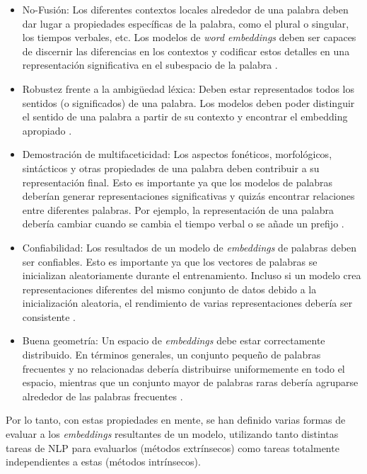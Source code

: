 \begin{itemize}
    \item No-Fusión: Los diferentes contextos locales alrededor de una palabra deben dar lugar a propiedades específicas de la palabra, como el plural o singular, los tiempos verbales, etc. Los modelos de \textit{word embeddings} deben ser capaces de discernir las diferencias en los contextos y codificar estos detalles en una representación significativa en el subespacio de la palabra \parencite{yaghoobzadeh2016intrinsicsubspaceevaluationword}.
    \item Robustez frente a la ambigüedad léxica: Deben estar representados todos los sentidos (o significados) de una palabra. Los modelos deben poder distinguir el sentido de una palabra a partir de su contexto y encontrar el embedding apropiado \parencite{yaghoobzadeh2016intrinsicsubspaceevaluationword}.
    \item Demostración de multifaceticidad: Los aspectos fonéticos, morfológicos, sintácticos y otras propiedades de una palabra deben contribuir a su representación final. Esto es importante ya que los modelos de palabras deberían generar representaciones significativas y quizás encontrar relaciones entre diferentes palabras. Por ejemplo, la representación de una palabra debería cambiar cuando se cambia el tiempo verbal o se añade un prefijo \parencite{yaghoobzadeh2016intrinsicsubspaceevaluationword}.
    \item Confiabilidad: Los resultados de un modelo de \textit{embeddings} de palabras deben ser confiables. Esto es importante ya que los vectores de palabras se inicializan aleatoriamente durante el entrenamiento. Incluso si un modelo crea representaciones diferentes del mismo conjunto de datos debido a la inicialización aleatoria, el rendimiento de varias representaciones debería ser consistente \parencite{HellrichH17}.
    \item Buena geometría: Un espacio de \textit{embeddings} debe estar correctamente distribuido. En términos generales, un conjunto pequeño de palabras frecuentes y no relacionadas debería distribuirse uniformemente en todo el espacio, mientras que un conjunto mayor de palabras raras debería agruparse alrededor de las palabras frecuentes \parencite{GladkovaDrozd2016}.
\end{itemize}

Por lo tanto, con estas propiedades en mente, se han definido varias formas de evaluar a los \textit{embeddings} resultantes de un modelo, utilizando tanto distintas tareas de NLP para evaluarlos (métodos extrínsecos) como tareas totalmente independientes a estas (métodos intrínsecos).

